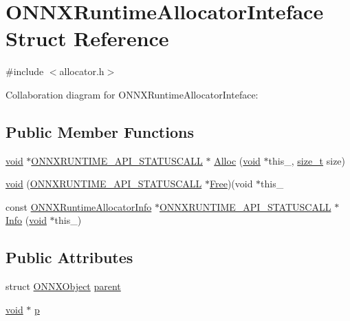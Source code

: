 \hypertarget{structONNXRuntimeAllocatorInteface}{}\section{O\+N\+N\+X\+Runtime\+Allocator\+Inteface Struct Reference}
\label{structONNXRuntimeAllocatorInteface}


{\ttfamily \#include $<$allocator.\+h$>$}



Collaboration diagram for O\+N\+N\+X\+Runtime\+Allocator\+Inteface\+:
\subsection*{Public Member Functions}
\begin{DoxyCompactItemize}
\item 
\mbox{\hyperlink{structONNXRuntimeAllocatorInteface_a54eabf966f0201ca7ad1be93fcf5f133}{void}} $\ast$\mbox{\hyperlink{error__code_8h_aeaeecdc9b792735c3e26fc0f9815c988}{O\+N\+N\+X\+R\+U\+N\+T\+I\+M\+E\+\_\+\+A\+P\+I\+\_\+\+S\+T\+A\+T\+U\+S\+C\+A\+LL}} $\ast$ \mbox{\hyperlink{structONNXRuntimeAllocatorInteface_a87c198fd69b56c2623890b82ec888446}{Alloc}} (\mbox{\hyperlink{structONNXRuntimeAllocatorInteface_a54eabf966f0201ca7ad1be93fcf5f133}{void}} $\ast$this\+\_\+, \mbox{\hyperlink{mlasi_8h_a503efbc1c6e50825320ad909366b78ab}{size\+\_\+t}} size)
\item 
\mbox{\hyperlink{structONNXRuntimeAllocatorInteface_a54eabf966f0201ca7ad1be93fcf5f133}{void}} (\mbox{\hyperlink{error__code_8h_aeaeecdc9b792735c3e26fc0f9815c988}{O\+N\+N\+X\+R\+U\+N\+T\+I\+M\+E\+\_\+\+A\+P\+I\+\_\+\+S\+T\+A\+T\+U\+S\+C\+A\+LL}} $\ast$\mbox{\hyperlink{default__cpu__allocator__c__api_8cc_a0a641453a140ac8ff8d71510ac74414c}{Free}})(void $\ast$this\+\_\+
\item 
const \mbox{\hyperlink{structONNXRuntimeAllocatorInfo}{O\+N\+N\+X\+Runtime\+Allocator\+Info}} $\ast$\mbox{\hyperlink{error__code_8h_aeaeecdc9b792735c3e26fc0f9815c988}{O\+N\+N\+X\+R\+U\+N\+T\+I\+M\+E\+\_\+\+A\+P\+I\+\_\+\+S\+T\+A\+T\+U\+S\+C\+A\+LL}} $\ast$ \mbox{\hyperlink{structONNXRuntimeAllocatorInteface_a13c36d4c697ed0b81ef81e5998599fec}{Info}} (\mbox{\hyperlink{structONNXRuntimeAllocatorInteface_a54eabf966f0201ca7ad1be93fcf5f133}{void}} $\ast$this\+\_\+)
\end{DoxyCompactItemize}
\subsection*{Public Attributes}
\begin{DoxyCompactItemize}
\item 
struct \mbox{\hyperlink{structONNXObject}{O\+N\+N\+X\+Object}} \mbox{\hyperlink{structONNXRuntimeAllocatorInteface_abff01465e68ebe03e480dd1d48f42d84}{parent}}
\item 
\mbox{\hyperlink{structONNXRuntimeAllocatorInteface_a54eabf966f0201ca7ad1be93fcf5f133}{void}} $\ast$ \mbox{\hyperlink{structONNXRuntimeAllocatorInteface_a89e0d3beadbc69c26d69988290dabb67}{p}}
\end{DoxyCompactItemize}


